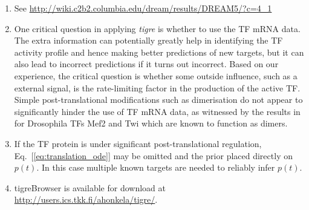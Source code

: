 \documentclass[11pt]{article}
\newcommand{\Rpackage}[1]{\emph{#1}}
\newcommand{\tigre}[0]{\Rpackage{tigre}}
\begin{document}
\begin{enumerate}
\item \label{note:dream}
  See \url{http://wiki.c2b2.columbia.edu/dream/results/DREAM5/?c=4_1}

\item \label{note:appl}
  One critical question in applying \tigre{} is whether to use the TF
  mRNA data.  The extra information can potentially greatly help in
  identifying the TF activity profile and hence making better
  predictions of new targets, but it can also lead to incorrect
  predictions if it turns out incorrect.  Based on our experience, the
  critical question is whether some outside influence, such as a
  external signal, is the rate-limiting factor in the production of the
  active TF.  Simple post-translational modifications such as
  dimerisation do not appear to significantly hinder the use of TF mRNA
  data, as witnessed by the results in~\cite{Honkela2010PNAS} for
  Drosophila TFs Mef2 and Twi which are known to function as dimers.

\item \label{note:eqs}
  If the TF protein is under
  significant post-translational regulation,
  Eq.~[\ref{eq:translation_ode}] may be omitted and the prior placed
  directly on $p(t)$.  In this case multiple known targets are needed
  to reliably infer $p(t)$.


\item \label{note:browser}
  tigreBrowser is available for download at
  \url{http://users.ics.tkk.fi/ahonkela/tigre/}.
\end{enumerate}



\end{document}
